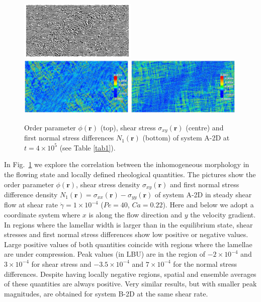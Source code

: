 \documentclass[8.5pt,twoside,twocolumn]{article}
\newcommand{\e}[1]{\times10^{#1}}
\begin{document}
\begin{figure}[htp]
\centering
\hspace*{-0.1cm}\includegraphics[angle=0,width=0.5\textwidth]{phi_run704_400.jpg}
\includegraphics[angle=0,width=0.49\textwidth]{shear_str_run704_400.jpg}
\includegraphics[angle=0,width=0.49\textwidth]{N1_run704_400.jpg}
\caption{Order parameter $\phi({\mathbf r})$ (top), shear stress $\sigma_{xy}({\mathbf r})$ (centre) and first normal stress differences $N_1({\mathbf r})$ (bottom) of system A-2D at $t=4\e{5}$ (see Table \ref{tab1}).}
\label{fig4}
\end{figure}

In Fig.~\ref{fig4} we explore the correlation between the inhomogeneous morphology in the flowing state and locally defined rheological quantities.
The pictures show the order parameter $\phi({\bm r})$, shear stress density $\sigma_{xy}({\bm r})$ and first normal stress difference density $N_1({\bm r})=\sigma_{xx}({\bm r})-\sigma_{yy}({\bm r})$ of system A-2D in steady shear flow at shear rate $\dot{\gamma}=1\e{-4}$ ($Pe = 40$, $Ca = 0.22$). Here and below we adopt a coordinate system where $x$ is along the flow direction and $y$ the velocity gradient.
In regions where the lamellar width is larger than in the equilibrium state, shear stresses and first normal stress differences show low positive or negative values.
Large positive values of both quantities coincide with regions where the lamellae are under compression.
Peak values (in LBU) are in the region of $-2\e{-4}$ and $3\e{-4}$ for shear stress and  $-3.5\e{-4}$ and $7\e{-4}$ for the normal stress differences.
Despite having locally negative regions, spatial and ensemble averages of these quantities are always positive.
Very similar results, but with smaller peak magnitudes, are obtained for system B-2D at the same shear rate.
\end{document}
